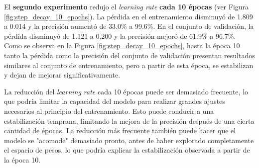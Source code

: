El \textbf{segundo experimento} redujo el \textit{learning rate} \textbf{cada 10 épocas} (ver Figura \ref{fig:step_decay_10_epochs}). La pérdida en el entrenamiento disminuyó de 1.809 a 0.014 y la precisión aumentó de 33.0\% a 99.6\%. En el conjunto de validación, la pérdida disminuyó de 1.121 a 0.200 y la precisión mejoró de 61.9\% a 96.7\%. Como se observa en la Figura \ref{fig:step_decay_10_epochs}, hasta la época 10 tanto la pérdida como la precisión del conjunto de validación presentan resultados similares al conjunto de entrenamiento, pero a partir de esta época, se estabilizan y dejan de mejorar significativamente.


La reducción del \textit{learning rate} cada 10 épocas puede ser demasiado frecuente, lo que podría limitar la capacidad del modelo para realizar grandes ajustes necesarios al principio del entrenamiento. Esto puede conducir a una estabilización temprana, limitando la mejora de la precisión después de una cierta cantidad de épocas. La reducción más frecuente también puede hacer que el modelo se "acomode" demasiado pronto, antes de haber explorado completamente el espacio de pesos, lo que podría explicar la estabilización observada a partir de la época 10.

